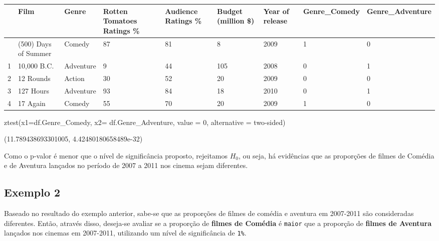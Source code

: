 \documentclass[
  letterpaper,
  DIV=11,
  numbers=noendperiod]{scrreprt}
\newenvironment{Shaded}{\begin{snugshade}}{\end{snugshade}}
\newcommand{\DecValTok}[1]{\textcolor[rgb]{0.68,0.00,0.00}{#1}}
\newcommand{\NormalTok}[1]{\textcolor[rgb]{0.00,0.23,0.31}{#1}}
\newcommand{\OperatorTok}[1]{\textcolor[rgb]{0.37,0.37,0.37}{#1}}
\newcommand{\StringTok}[1]{\textcolor[rgb]{0.13,0.47,0.30}{#1}}
\begin{document}
\begin{longtable}[]{@{}lllllllll@{}}
\toprule\noalign{}
& Film & Genre & Rotten Tomatoes Ratings \% & Audience Ratings \% &
Budget (million \$) & Year of release & Genre\_Comedy &
Genre\_Adventure \\
\midrule\noalign{}
\endhead
\bottomrule\noalign{}
\endlastfoot
0 & (500) Days of Summer & Comedy & 87 & 81 & 8 & 2009 & 1 & 0 \\
1 & 10,000 B.C. & Adventure & 9 & 44 & 105 & 2008 & 0 & 1 \\
2 & 12 Rounds & Action & 30 & 52 & 20 & 2009 & 0 & 0 \\
3 & 127 Hours & Adventure & 93 & 84 & 18 & 2010 & 0 & 1 \\
4 & 17 Again & Comedy & 55 & 70 & 20 & 2009 & 1 & 0 \\
\end{longtable}

\begin{Shaded}
\begin{Highlighting}[]
\NormalTok{ztest(x1}\OperatorTok{=}\NormalTok{df.Genre\_Comedy, x2}\OperatorTok{=}\NormalTok{ df.Genre\_Adventure, value }\OperatorTok{=} \DecValTok{0}\NormalTok{, alternative }\OperatorTok{=} \StringTok{\textquotesingle{}two{-}sided\textquotesingle{}}\NormalTok{)}
\end{Highlighting}
\end{Shaded}

\begin{tcolorbox}[enhanced jigsaw, breakable, leftrule=.75mm, left=2mm, opacityback=0, bottomrule=.15mm, toprule=.15mm, rightrule=.15mm, arc=.35mm, colback=white]

(11.789438693301005, 4.42480180658489e-32)

\end{tcolorbox}

Como o p-valor é menor que o nível de significância proposto, rejeitamos
\(H_0\), ou seja, há evidências que as proporções de filmes de Comédia e
de Aventura lançados no período de 2007 a 2011 nos cinema sejam
diferentes.

\hypertarget{exemplo-2-3}{%
\subsection{Exemplo 2}\label{exemplo-2-3}}

Baseado no resultado do exemplo anterior, sabe-se que as proporções de
filmes de comédia e aventura em 2007-2011 são consideradas diferentes.
Então, através disso, deseja-se avaliar se a proporção de \textbf{filmes
de Comédia} é \texttt{maior} que a proporção de \textbf{filmes de
Aventura} lançados nos cinemas em 2007-2011, utilizando um nível de
significância de \texttt{1\%}.
\end{document}
